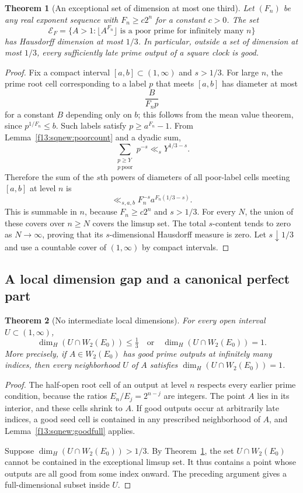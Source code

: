 \documentclass[11pt,a4paper]{article}
\newtheorem{theorem}{Theorem}[section]
\theoremstyle{definition}
\theoremstyle{remark}
\numberwithin{equation}{section}
\begin{document}
\begin{theorem}[An exceptional set of dimension at most one third]
\label{f13:sqnew:exceptionaldimension}
Let $(F_n)$ be any real exponent sequence with $F_n\ge c2^n$ for a
constant $c>0$. The set
\[
 \mathcal E_F=
 \{A>1:\lfloor A^{F_n}\rfloor\text{ is a poor prime for infinitely
 many }n\}
\]
has Hausdorff dimension at most $1/3$.
In particular, outside a set of dimension at most $1/3$, every
sufficiently late prime output of a square clock is good.
\end{theorem}
\begin{proof}
Fix a compact interval $[a,b]\subset(1,\infty)$ and $s>1/3$.
For large $n$, the prime root cell corresponding to a label $p$ that
meets $[a,b]$ has diameter at most
\[
 \frac{B}{F_n p}
\]
for a constant $B$ depending only on $b$; this follows from the mean value
theorem, since $p^{1/F_n}\le b$. Such labels satisfy
$p\ge a^{F_n}-1$. From Lemma~\ref{f13:sqnew:poorcount} and a dyadic sum,
\[
 \sum_{\substack{p\ge Y\\p\ \text{poor}}}p^{-s}
 \ll_s Y^{1/3-s}.
\]
Therefore the sum of the $s$th powers of diameters of all poor-label
cells meeting $[a,b]$ at level $n$ is
\[
 \ll_{s,a,b} F_n^{-s}a^{F_n(1/3-s)}.
\]
This is summable in $n$, because $F_n\ge c2^n$ and $s>1/3$.
For every $N$, the union of these covers over $n\ge N$ covers the
limsup set. The total $s$-content tends to zero as $N\to\infty$, proving
that its $s$-dimensional Hausdorff measure is zero. Let $s\downarrow1/3$
and use a countable cover of $(1,\infty)$ by compact intervals.
\end{proof}

\subsection{A local dimension gap and a canonical perfect part}

\begin{theorem}[No intermediate local dimensions]\label{f13:sqnew:dichotomy}
For every open interval $U\subset(1,\infty)$,
\[
 \boxed{\dim_H(U\cap W_2(E_0))\le\tfrac13
       \quad\text{or}\quad
       \dim_H(U\cap W_2(E_0))=1.}
\]
More precisely, if $A\in W_2(E_0)$ has good prime outputs at infinitely
many indices, then every neighborhood $U$ of $A$ satisfies
$\dim_H(U\cap W_2(E_0))=1$.
\end{theorem}
\begin{proof}
The half-open root cell of an output at level $n$ respects every earlier
prime condition, because the ratios $E_n/E_j=2^{n-j}$ are integers.
The point $A$ lies in its interior, and these cells shrink to $A$. If good outputs occur at
arbitrarily late indices, a good seed cell is contained in any prescribed
neighborhood of $A$, and Lemma~\ref{f13:sqnew:goodfull} applies.

Suppose $\dim_H(U\cap W_2(E_0))>1/3$. By
Theorem~\ref{f13:sqnew:exceptionaldimension}, the set $U\cap W_2(E_0)$ cannot
be contained in the exceptional limsup set. It thus contains a point
whose outputs are all good from some index onward. The preceding
argument gives a full-dimensional subset inside $U$.
\end{proof}
\end{document}
